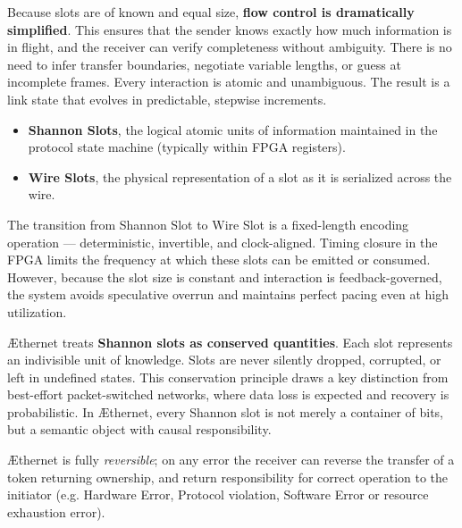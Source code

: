 \documentclass[../OAE-SPEC-MAIN.tex]{subfiles}
\begin{document}
Because slots are of known and equal size, \textbf{flow control is dramatically simplified}. This ensures that the sender knows exactly how much information is in flight, and the receiver can verify completeness without ambiguity. There is no need to infer transfer boundaries, negotiate variable lengths, or guess at incomplete frames. Every interaction is atomic and unambiguous. The result is a link state that evolves in predictable, stepwise increments.

\begin{highlightbox}[Definitions]
\begin{itemize}
\item \textbf{Shannon Slots}, the logical atomic units of information maintained in the protocol state machine (typically within FPGA registers).
\item \textbf{Wire Slots}, the physical representation of a slot as it is serialized across the wire.
\end{itemize}
\end{highlightbox}


The transition from Shannon Slot to Wire Slot is a fixed-length encoding operation — deterministic, invertible, and clock-aligned. Timing closure in the FPGA limits the frequency at which these slots can be emitted or consumed. However, because the slot size is constant and interaction is feedback-governed, the system avoids speculative overrun and maintains perfect pacing even at high utilization.

\AE thernet treats \textbf{Shannon slots as conserved quantities}. Each slot represents an indivisible unit of knowledge. Slots are never silently dropped, corrupted, or left in undefined states. This conservation principle draws a key distinction from best-effort packet-switched networks, where data loss is expected and recovery is probabilistic. In \AE thernet, every Shannon slot is not merely a container of bits, but a semantic object with causal responsibility.

\AE thernet is fully \emph{reversible}; on any error the receiver can reverse the transfer of a token returning ownership, and return responsibility  for correct operation to the initiator  (e.g. Hardware Error, Protocol violation, Software Error or resource exhaustion error). 





\end{document}
